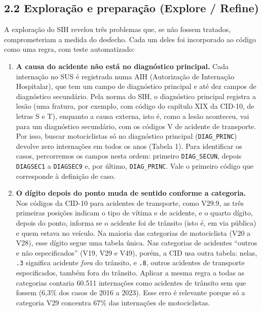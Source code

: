 \documentclass[
  11pt,
]{article}
\providecommand{\tightlist}{%
  \setlength{\itemsep}{0pt}\setlength{\parskip}{0pt}}
\begin{document}
\hypertarget{explorauxe7uxe3o-e-preparauxe7uxe3o-explore-refine}{%
\subsection{2.2 Exploração e preparação (Explore / Refine)}\label{explorauxe7uxe3o-e-preparauxe7uxe3o-explore-refine}}

A exploração do SIH revelou três problemas que, se não fossem tratados, comprometeriam a medida do desfecho. Cada um deles foi incorporado ao código como uma regra, com teste automatizado:

\begin{enumerate}
\def\labelenumi{\arabic{enumi}.}
\tightlist
\item \textbf{A causa do acidente não está no diagnóstico principal.} Cada internação no SUS é registrada numa AIH (Autorização de Internação Hospitalar), que tem um campo de diagnóstico principal e até dez campos de diagnóstico secundário. Pela norma do SIH, o diagnóstico principal registra a lesão (uma fratura, por exemplo, com código do capítulo XIX da CID-10, de letras S e T), enquanto a causa externa, isto é, como a lesão aconteceu, vai para um diagnóstico secundário, com os códigos V de acidente de transporte. Por isso, buscar motociclistas só no diagnóstico principal (\texttt{DIAG\_PRINC}) devolve zero internações em todos os anos (Tabela 1). Para identificar os casos, percorremos os campos nesta ordem: primeiro \texttt{DIAG\_SECUN}, depois \texttt{DIAGSEC1} a \texttt{DIAGSEC9} e, por último, \texttt{DIAG\_PRINC}. Vale o primeiro código que corresponde à definição de caso.
\item \textbf{O dígito depois do ponto muda de sentido conforme a categoria.} Nos códigos da CID-10 para acidentes de transporte, como V29.9, as três primeiras posições indicam o tipo de vítima e de acidente, e o quarto dígito, depois do ponto, informa se o acidente foi de trânsito (isto é, em via pública) e quem estava no veículo. Na maioria das categorias de motociclista (V20 a V28), esse dígito segue uma tabela única. Nas categorias de acidentes ``outros e não especificados'' (V19, V29 e V49), porém, a CID usa outra tabela: nelas, \texttt{.3} significa acidente \emph{fora} do trânsito, e \texttt{.8}, outros acidentes de transporte especificados, também fora do trânsito. Aplicar a mesma regra a todas as categorias contaria 60.511 internações como acidentes de trânsito sem que fossem (6,3\% dos casos de 2016 a 2023). Esse erro é relevante porque só a categoria V29 concentra 67\% das internações de motociclistas.

\end{enumerate}
\end{document}
